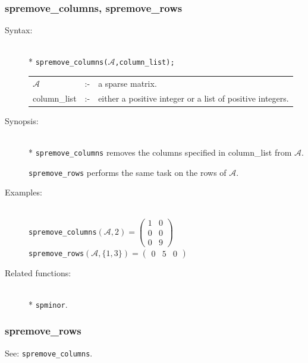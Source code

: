 \subsubsection{spremove\_columns, spremove\_rows}
\label{sparse:spremove_columns}
\hypertarget{operator:SPREMOVE_COLUMNS}{}

\begin{description}
\item[Syntax:]\mbox{}\\*
{\tt spremove\_columns($\mathcal{A}$,column\_list);}\\[2mm]
\begin{tabular}{l l l}
$\mathcal{A}$   &:-& a sparse matrix. \\
column\_list &:-& either a positive integer or a list of
                  positive integers.
\end{tabular}

\item[Synopsis:]\mbox{}\\*
\texttt{spremove\_columns} removes the columns specified in
                column\_list from $\mathcal{A}$.

\texttt{spremove\_rows} performs the same task on the rows
                of $\mathcal{A}$.

\item[Examples:]\mbox{}\\
\texttt{spremove\_columns}\((\mathcal{A},2) =
        \begin{pmatrix} 1 & 0 \\ 0 & 0 \\ 0 & 9  \end{pmatrix}\) \\[2mm]
\texttt{spremove\_rows}\((\mathcal{A},\{1,3\}) =
        \begin{pmatrix} 0 & 5 & 0 \end{pmatrix}\)


\item[Related functions:]\mbox{}\\*
\texttt{spminor}.
\end{description}

\subsubsection{spremove\_rows}
\label{sparse:spremove_rows}
\hypertarget{operator:SPREMOVE_ROWS}{}

See: \texttt{spremove\_columns}.


